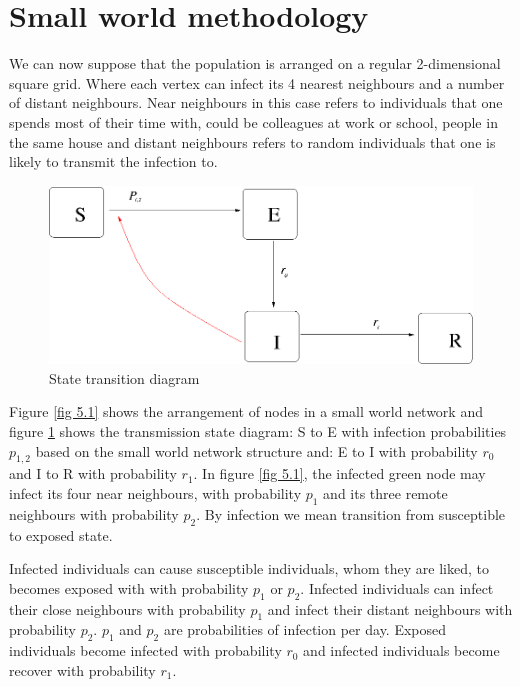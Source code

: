 \section{Small world methodology}

We  can now suppose that the population is arranged on a regular
2-dimensional square grid.  Where each vertex can infect its 4 nearest neighbours and a number of distant neighbours. Near neighbours in this case refers
to individuals that one spends most of their time with, could be colleagues at work or school, people in the same house and distant neighbours refers to random individuals that one is likely to transmit the infection to. 
 
 \begin{figure}[h]
 \centering
 \includegraphics[scale=0.3]{images/swseir.png}
 \caption{State transition diagram} \label{fig 5.2}
\end{figure}

 
Figure \ref{fig 5.1} shows the arrangement of nodes in a small world network and figure \ref{fig 5.2} shows the transmission state diagram:
S to E  with infection probabilities $p_ {1,2} $ based on the small world network structure and: E to I with probability $r_0$ and I to R with probability $r_1$. In figure \ref{fig 5.1}, the infected green node may infect its four near neighbours, with probability $p_1$ and its three remote neighbours with probability $p_2$. By infection we mean transition from susceptible to exposed state. 

Infected individuals can cause susceptible individuals, whom they are liked,
to becomes exposed with with probability $p_1$ or $p_2$. Infected individuals can  infect their close neighbours with  probability $p_1$ and infect their distant neighbours with probability $p_2$. $p_1 $ and $p_2$ are probabilities of infection per day. Exposed individuals become infected with probability $r_0$ and infected individuals become recover with probability $r_1$.

